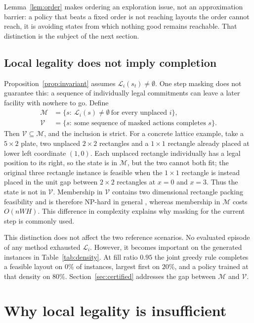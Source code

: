 \documentclass[preprint,12pt,authoryear]{elsarticle}
\newcommand{\cL}{\mathcal{L}}
\newcommand{\cM}{\mathcal{M}}
\newcommand{\cV}{\mathcal{V}}
\begin{document}
Lemma~\ref{lem:order} makes ordering an exploration issue, not an
approximation barrier: a policy that beats a fixed order is not reaching
layouts the order cannot reach, it is avoiding states from which nothing good
remains reachable. That distinction is the subject of the next section.

\subsection{Local legality does not imply completion}
\label{sec:binding}
Proposition~\ref{prop:invariant} assumes $\cL_i(s_t)\neq\emptyset$. One step
masking does not guarantee this: a sequence of individually legal commitments can
leave a later facility with nowhere to go. Define
\begin{align}
\cM&=\{s:\ \cL_i(s)\neq\emptyset\ \text{for every unplaced } i\},\\
\cV&=\{s:\ \text{some sequence of masked actions completes } s\}.
\end{align}
Then $\cV\subseteq\cM$, and the inclusion is strict. For a concrete lattice
example, take a $5\times2$ plate, two unplaced $2\times2$ rectangles and a
$1\times1$ rectangle already placed at lower left coordinate $(1,0)$. Each
unplaced rectangle individually has a legal position to its right, so the state
is in $\cM$, but the two cannot both fit; the original three rectangle instance
is feasible when the $1\times1$ rectangle is instead placed in the unit gap
between $2\times2$ rectangles at $x=0$ and $x=3$. Thus the state is not in
$\cV$. Membership in $\cV$ contains two dimensional rectangle packing
feasibility and is therefore NP-hard in general \citep{Fowler1981Packing},
whereas membership in $\cM$ costs $O(nWH)$. This difference in complexity
explains why masking for the current step is commonly used.

This distinction does not affect the two reference scenarios. No evaluated
episode of any method exhausted $\cL_i$. However, it becomes important on the
generated instances in Table~\ref{tab:density}. At fill ratio $0.95$ the joint greedy rule
completes a feasible layout on $0\%$ of instances, largest first on $20\%$, and a
policy trained at that density on $80\%$. Section~\ref{sec:certified} addresses
the gap between $\cM$ and $\cV$.

\fi

\section{Why local legality is insufficient}
\label{sec:improve}
\label{sec:improve_empirical}
\label{sec:construct}
\end{document}
